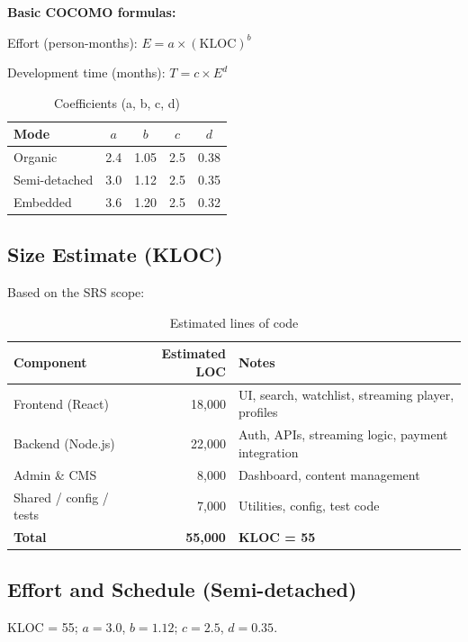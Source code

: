\documentclass[12pt,a4paper]{article}
\newcommand{\sdlcsubsection}[1]{%
  \needspace{7\baselineskip}%
  \subsection*{\fontsize{14pt}{1.2}\selectfont #1}%
  \nopagebreak
}
\begin{document}
\textbf{Basic COCOMO formulas:}

Effort (person-months): \( E = a \times (\text{KLOC})^b \)

Development time (months): \( T = c \times E^d \)

\begin{table}[htbp]
  \centering
  \caption{Coefficients (a, b, c, d)}
  \begin{tabular}{@{}lcccc@{}}
    \toprule
    \textbf{Mode} & \( a \) & \( b \) & \( c \) & \( d \) \\
    \midrule
    Organic       & 2.4     & 1.05    & 2.5     & 0.38    \\
    Semi-detached & 3.0     & 1.12    & 2.5     & 0.35    \\
    Embedded      & 3.6     & 1.20    & 2.5     & 0.32    \\
    \bottomrule
  \end{tabular}
\end{table}

\sdlcsubsection{Size Estimate (KLOC)}

Based on the SRS scope:

\begin{table}[htbp]
  \centering
  \caption{Estimated lines of code}
  \begin{tabular}{@{}lrp{5.5cm}@{}}
    \toprule
    \textbf{Component}      & \textbf{Estimated LOC} & \textbf{Notes}                                    \\
    \midrule
    Frontend (React)        & 18,000                 & UI, search, watchlist, streaming player, profiles \\
    Backend (Node.js)       & 22,000                 & Auth, APIs, streaming logic, payment integration  \\
    Admin \& CMS            & 8,000                  & Dashboard, content management                     \\
    Shared / config / tests & 7,000                  & Utilities, config, test code                      \\
    \midrule
    \textbf{Total}          & \textbf{55,000}        & \textbf{KLOC = 55}                                \\
    \bottomrule
  \end{tabular}
\end{table}

\sdlcsubsection{Effort and Schedule (Semi-detached)}

KLOC = 55; \( a = 3.0 \), \( b = 1.12 \); \( c = 2.5 \), \( d = 0.35 \).
\end{document}
